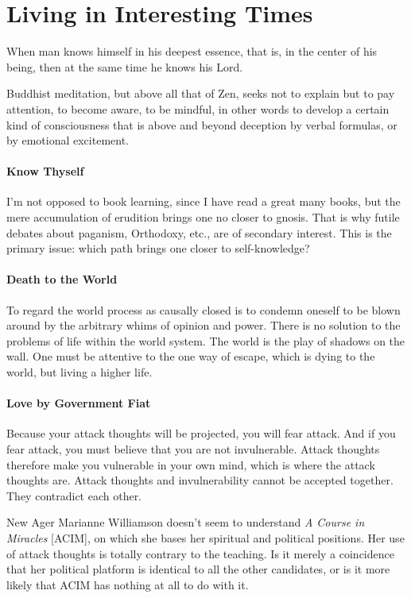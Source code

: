 \section{Living in Interesting Times}

\begin{quotex}
When man knows himself in his deepest essence, that is, in the center of his being, then at the same time he knows his Lord. 

Buddhist meditation, but above all that of Zen, seeks not to explain but to pay attention, to become aware, to be mindful, in other words to develop a certain kind of consciousness that is above and beyond deception by verbal formulas, or by emotional excitement. 

\end{quotex}
\paragraph{Know Thyself}
I'm not opposed to book learning, since I have read a great many books, but the mere accumulation of erudition brings one no closer to gnosis. That is why futile debates about paganism, Orthodoxy, etc., are of secondary interest. This is the primary issue: which path brings one closer to self-knowledge?

\paragraph{Death to the World}
To regard the world process as causally closed is to condemn oneself to be blown around by the arbitrary whims of opinion and power. There is no solution to the problems of life within the world system. The world is the play of shadows on the wall. One must be attentive to the one way of escape, which is dying to the world, but living a higher life.

\paragraph{Love by Government Fiat}
\begin{quotex}
Because your attack thoughts will be projected, you will fear attack. And if you fear attack, you must believe that you are not invulnerable. Attack thoughts therefore make you vulnerable in your own mind, which is where the attack thoughts are. Attack thoughts and invulnerability cannot be accepted together. They contradict each other. 

\end{quotex}
New Ager Marianne Williamson doesn't seem to understand \emph{A Course in Miracles} [ACIM], on which she bases her spiritual and political positions. Her use of attack thoughts is totally contrary to the teaching. Is it merely a coincidence that her political platform is identical to all the other candidates, or is it more likely that ACIM has nothing at all to do with it.

